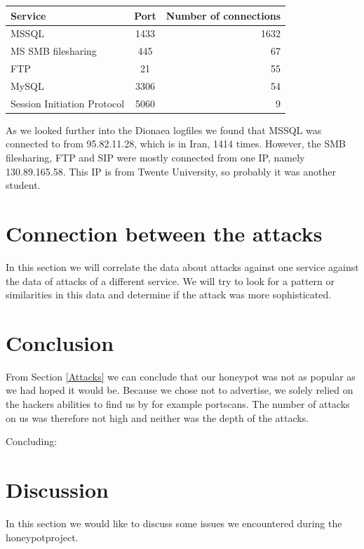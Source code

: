 \documentclass[11pt]{article}
\begin{document}
\begin{tabular}{|l|c|r|}
\hline
Service & Port & Number of connections \\ \hline
MSSQL  & 1433 & 1632 \\ \hline
MS SMB filesharing & 445 & 67 \\ \hline
FTP & 21 & 55 \\ \hline
MySQL & 3306 & 54 \\ \hline
Session Initiation Protocol & 5060 & 9 \\ \hline
\end{tabular}

As we looked further into the Dionaea logfiles we found that MSSQL was connected to from 95.82.11.28, which is in Iran, 1414 times. However, the SMB filesharing, FTP and SIP were mostly connected from one IP, namely 130.89.165.58. This IP is from Twente University, so probably it was another student.



\section{Connection between the attacks}
\label{Connection}
In this section we will correlate the data about attacks against one service against the data of attacks of a different service. We will try to look for a pattern or similarities in this data and determine if the attack was more sophisticated.


\section{Conclusion}
\label{Conclusion}
From Section \ref{Attacks} we can conclude that our honeypot was not as popular as we had hoped it would be. Because we chose not to advertise, we solely relied on the hackers abilities to find us by for example portscans. The number of attacks on us was therefore not high and neither was the depth of the attacks. 

Concluding: 


\section{Discussion}
\label{Discussion}
In this section we would like to discuss some issues we encountered during the honeypotproject. 
\end{document}
